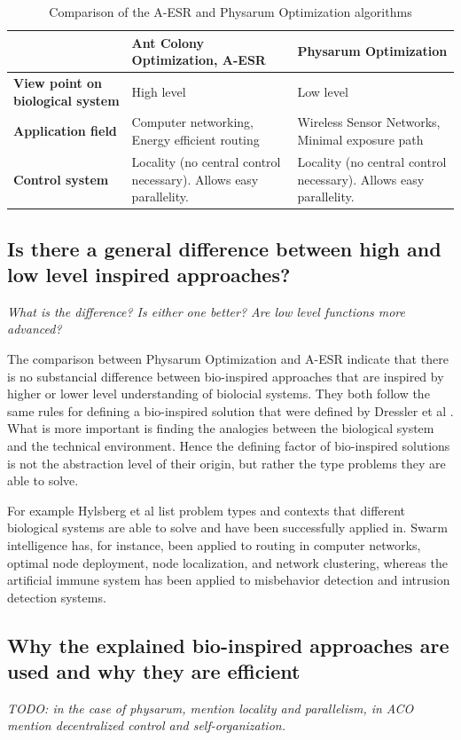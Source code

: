 \documentclass[cameraready]{IWORK2014}
\begin{document}
\begin{table}
	\begin{tabularx}{\linewidth}{|X|X|X|}
		\hline & \textbf{Ant Colony Optimization, A-ESR} & \textbf{Physarum Optimization} \\ \hline
		\textbf{View point on biological system} & High level & Low level \\ \hline
		\textbf{Application field} & Computer networking, Energy efficient routing & Wireless Sensor Networks, Minimal exposure path \\ 	\hline
		\textbf{Control system} & Locality (no central control necessary). Allows easy parallelity. & Locality (no central control necessary). Allows easy parallelity. \\ \hline
	\end{tabularx}
	\caption{Comparison of the A-ESR and Physarum Optimization algorithms}
	\label{tbl:aco-po-comparison}
\end{table}

\subsection{Is there a general difference between high and low level inspired approaches?}
\textit{What is the difference? Is either one better? Are low level functions more advanced?}

The comparison between Physarum Optimization and A-ESR indicate that there is no substancial difference between bio-inspired approaches that are inspired by higher or lower level understanding of biolocial systems. They both follow the same rules for defining a bio-inspired solution that were defined by Dressler et al \cite{dressler2010bio}. What is more important is finding the analogies between the biological system and the technical environment. Hence the defining factor of bio-inspired solutions is not the abstraction level of their origin, but rather the type problems they are able to solve.

For example Hylsberg et al \cite{hylsberg2011bioinspired} list problem types and contexts that different biological systems are able to solve and have been successfully applied in. Swarm intelligence has, for instance, been applied to routing in computer networks, optimal node deployment, node localization, and network clustering, whereas the artificial immune system has been applied to misbehavior detection and intrusion detection systems.

\subsection{Why the explained bio-inspired approaches are used and why they are efficient}
\textit{TODO: in the case of physarum, mention locality and parallelism, in ACO mention decentralized control and self-organization.}
\end{document}
